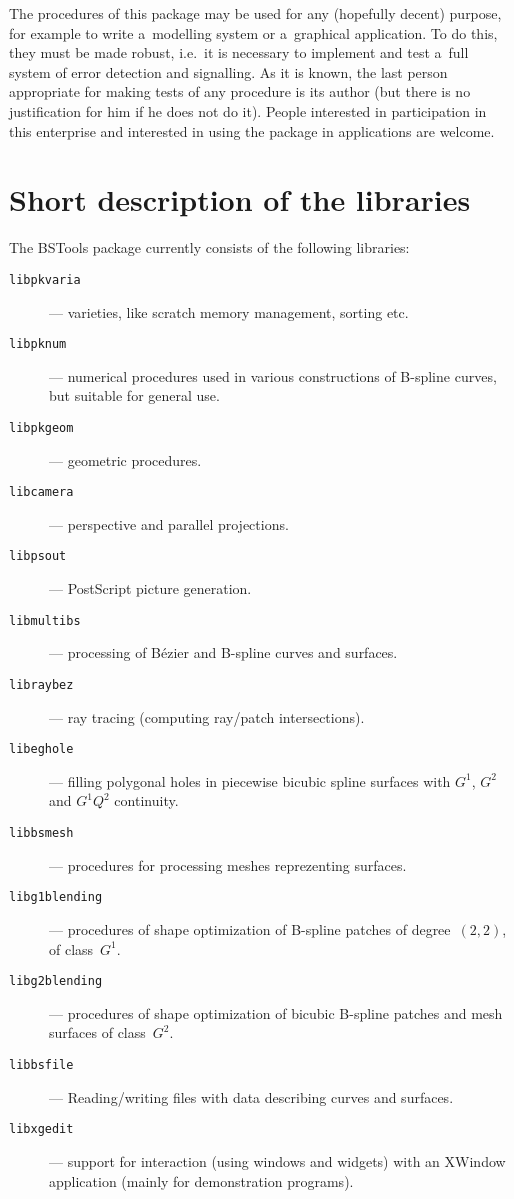 \vspace{\medskipamount}
The procedures of this package may be used for any (hopefully decent)
purpose, for example to write a~modelling system or a~graphical application.
To do this, they must be made robust, i.e.\ it is necessary to implement
and test a~full system of error detection and signalling.
As it is known, the last person appropriate for making tests of any
procedure is its author (but there is no justification for him if
he does not do it). People interested in participation in this enterprise
and interested in using the package in applications are welcome.


\section{Short description of the libraries}

The BSTools package currently consists of the following libraries:
\begin{description}
\item[\texttt{libpkvaria}]--- varieties, like scratch memory management,
sorting etc.
\item[\texttt{libpknum}]--- numerical procedures used in various constructions
of B-spline curves, but suitable for general use.
\item[\texttt{libpkgeom}]--- geometric procedures.
\item[\texttt{libcamera}]--- perspective and parallel projections.
\item[\texttt{libpsout}]--- PostScript\raisebox{3pt}{\tiny(TM)} picture
generation.
\item[\texttt{libmultibs}]--- processing of B\'{e}zier and B-spline
curves and surfaces.
\item[\texttt{libraybez}]--- ray tracing (computing ray/patch intersections).
\item[\texttt{libeghole}]--- filling polygonal holes in piecewise bicubic
spline surfaces with $G^1$, $G^2$ and $G^1Q^2$ continuity.
\item[\texttt{libbsmesh}]--- procedures for processing meshes reprezenting
surfaces.
\item[\texttt{libg1blending}]--- procedures of shape optimization of
B-spline patches of degree~$(2,2)$, of class~$G^1$.
\item[\texttt{libg2blending}]--- procedures of shape optimization of bicubic
B-spline patches and mesh surfaces of class~$G^2$.
\item[\texttt{libbsfile}]--- Reading/writing files with data describing
curves and surfaces.
\item[\texttt{libxgedit}]--- support for interaction (using windows
and widgets) with an XWindow application (mainly for demonstration programs).
\end{description}


